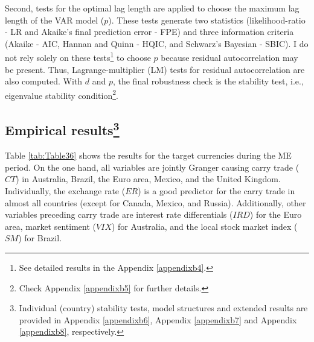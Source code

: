 \documentclass[a4paper, twoside]{templates/ociamthesis}
\begin{document}
Second, tests for the optimal lag length are applied to choose the maximum lag length of the VAR model (\(p\)). These tests generate two statistics (likelihood-ratio - LR and Akaike's final prediction error - FPE) and three information criteria (Akaike - AIC, Hannan and Quinn - HQIC, and Schwarz's Bayesian - SBIC). I do not rely solely on these tests\footnote{See detailed results in the Appendix \ref{appendixb4}.} to choose \(p\) because residual autocorrelation may be present. Thus, Lagrange-multiplier (LM) tests for residual autocorrelation are also computed. With \(d\) and \(p\), the final robustness check is the stability test, i.e., eigenvalue stability condition\footnote{Check Appendix \ref{appendixb5} for further details.}.

\hypertarget{threethreetwo}{%
\subsection[Empirical results]{\texorpdfstring{Empirical results\footnote{Individual (country) stability tests, model structures and extended results are provided in Appendix \ref{appendixb6}, Appendix \ref{appendixb7} and Appendix \ref{appendixb8}, respectively.}}{Empirical results}}\label{threethreetwo}}

Table \ref{tab:Table36} shows the results for the target currencies during the ME period. On the one hand, all variables are jointly Granger causing carry trade (\(CT\)) in Australia, Brazil, the Euro area, Mexico, and the United Kingdom. Individually, the exchange rate (\(ER\)) is a good predictor for the carry trade in almost all countries (except for Canada, Mexico, and Russia). Additionally, other variables preceding carry trade are interest rate differentials (\(IRD\)) for the Euro area, market sentiment (\(VIX\)) for Australia, and the local stock market index (\(SM\)) for Brazil.
\end{document}
